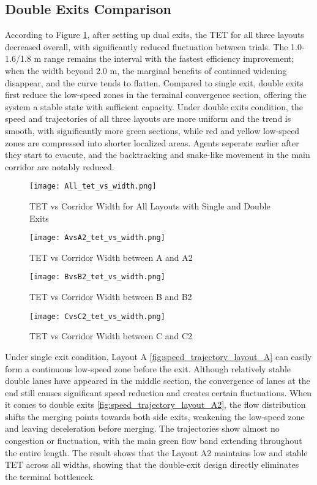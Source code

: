 \subsection{Double Exits Comparison}
According to Figure \ref{fig:all_tet_vs_width}, after setting up dual exits, the TET for all three layouts decreased overall, with significantly reduced fluctuation between trials. The 1.0-1.6/1.8 m range remains the interval with the fastest efficiency improvement; when the width beyond 2.0 m, the marginal benefits of continued widening disappear, and the curve tends to flatten. Compared to single exit, double exits first reduce the low-speed zones in the terminal convergence section, offering the system a stable state with sufficient capacity. Under double exits condition, the speed and trajectories of all three layouts are more uniform and the trend is smooth, with significantly more green sections, while red and yellow low-speed zones are compressed into shorter localized areas. Agents seperate earlier after they start to evacute, and the backtracking and snake-like movement in the main corridor are notably reduced.

\begin{figure}[h]
    \centering
    \texttt{[image: All\_tet\_vs\_width.png]}
    \caption{TET vs Corridor Width for All Layouts with Single and Double Exits}
    \label{fig:all_tet_vs_width}
\end{figure}

\begin{figure}[h]
    \texttt{[image: AvsA2\_tet\_vs\_width.png]}
    \caption{TET vs Corridor Width between A and A2}\label{fig:AvsA2_tet_vs_width}
\end{figure}

\begin{figure}[h]
    \texttt{[image: BvsB2\_tet\_vs\_width.png]}
    \caption{TET vs Corridor Width between B and B2}\label{fig:BvsB2_tet_vs_width}
\end{figure}

\begin{figure}[h]
    \texttt{[image: CvsC2\_tet\_vs\_width.png]}
    \caption{TET vs Corridor Width between C and C2}\label{fig:CvsC2_tet_vs_width}
\end{figure}
Under single exit condition, Layout A \ref{fig:speed_trajectory_layout_A} can easily form a continuous low-speed zone before the exit. Although relatively stable double lanes have appeared in the middle section, the convergence of lanes at the end still causes significant speed reduction and creates certain fluctuations. When it comes to double exits \ref{fig:speed_trajectory_layout_A2}, the flow distribution shifts the merging points towards both side exits, weakening the low-speed zone and leaving deceleration before merging. The trajectories show almost no congestion or fluctuation, with the main green flow band extending throughout the entire length. The result shows that the Layout A2 maintains low and stable TET across all widths, showing that the double-exit design directly eliminates the terminal bottleneck.

